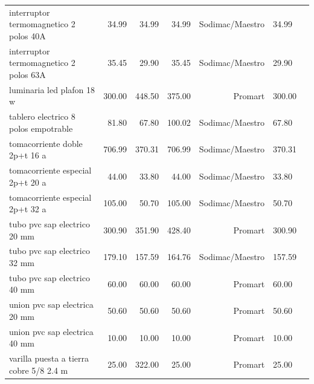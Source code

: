\begin{longtable}{p{4.5cm}rrrrp{2.5cm}r}
interruptor termomagnetico 2 polos 40A & 34.99 & 34.99 & 34.99 & Sodimac/Maestro & 34.99 \\
interruptor termomagnetico 2 polos 63A & 35.45 & 29.90 & 35.45 & Sodimac/Maestro & 29.90 \\
luminaria led plafon 18 w & 300.00 & 448.50 & 375.00 & Promart & 300.00 \\
tablero electrico 8 polos empotrable & 81.80 & 67.80 & 100.02 & Sodimac/Maestro & 67.80 \\
tomacorriente doble 2p+t 16 a & 706.99 & 370.31 & 706.99 & Sodimac/Maestro & 370.31 \\
tomacorriente especial 2p+t 20 a & 44.00 & 33.80 & 44.00 & Sodimac/Maestro & 33.80 \\
tomacorriente especial 2p+t 32 a & 105.00 & 50.70 & 105.00 & Sodimac/Maestro & 50.70 \\
tubo pvc sap electrico 20 mm & 300.90 & 351.90 & 428.40 & Promart & 300.90 \\
tubo pvc sap electrico 32 mm & 179.10 & 157.59 & 164.76 & Sodimac/Maestro & 157.59 \\
tubo pvc sap electrico 40 mm & 60.00 & 60.00 & 60.00 & Promart & 60.00 \\
union pvc sap electrica 20 mm & 50.60 & 50.60 & 50.60 & Promart & 50.60 \\
union pvc sap electrica 40 mm & 10.00 & 10.00 & 10.00 & Promart & 10.00 \\
varilla puesta a tierra cobre 5/8 2.4 m & 25.00 & 322.00 & 25.00 & Promart & 25.00 \\
\bottomrule\end{longtable}\normalsize

